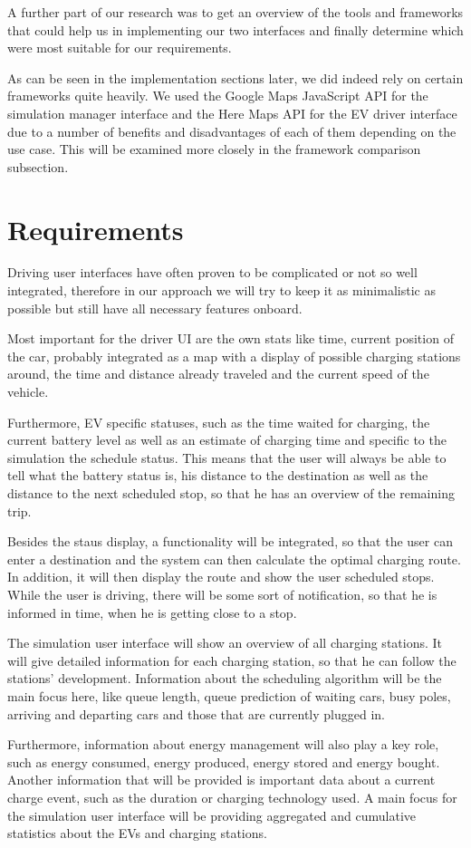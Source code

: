A further part of our research was to get an overview of the tools and frameworks that could help us in implementing our two interfaces and finally determine which were most suitable for our requirements.

As can be seen in the implementation sections later, we did indeed rely on certain frameworks quite heavily. We used the Google Maps JavaScript API for the simulation manager interface and the Here Maps API for the EV driver interface due to a number of benefits and disadvantages of each of them depending on the use case. This will be examined more closely in the framework comparison subsection.


\section{Requirements}

Driving user interfaces have often proven to be complicated or not so well integrated, therefore in our approach we
will try to keep it as minimalistic as possible but still have all necessary features onboard.

Most important for the
driver UI are the own stats like time, current position of the car, probably integrated as a map with a display of
possible charging stations around, the time and distance already traveled and the current speed of the vehicle.

Furthermore, EV specific statuses, such as the time waited for charging, the current battery level as well as an
estimate of charging time and specific to the simulation the schedule status. This means that the user will always
be able to tell what the battery status is, his distance to the destination as well as the distance to the next
scheduled stop, so that he has an overview of the remaining trip.

Besides the staus display, a functionality will be integrated, so that the user can enter a destination and the
system can then calculate the optimal charging route. In addition, it will then display the route and show the user
scheduled stops. While the user is driving, there will be some sort of notification, so that he is informed in time,
when he is getting close to a stop.

The simulation user interface will show an overview of all charging stations. It will give detailed information for
each charging station, so that he can follow the stations' development. Information about the scheduling algorithm
will be the main focus here, like queue length, queue prediction of waiting cars, busy poles, arriving and departing
cars and those that are currently plugged in.

Furthermore, information about energy management will also play a key role, such as energy consumed, energy produced,
energy stored and energy bought. Another information that will be provided is important data about a current
charge event, such as the duration or charging technology used. A main focus for the simulation user interface
will be providing aggregated and cumulative statistics about the EVs and charging stations.
